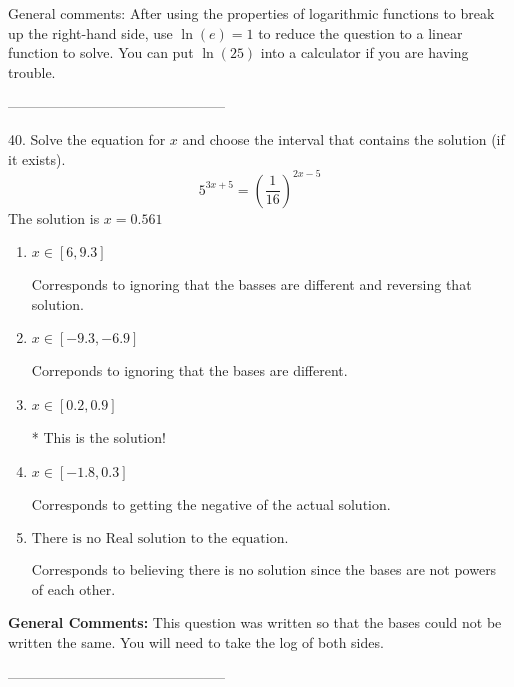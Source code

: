 \documentclass{article}[10pt]
\begin{document}
General comments: After using the properties of logarithmic functions to break up the right-hand side, use $\ln(e) = 1$ to reduce the question to a linear function to solve. You can put $\ln(25)$ into a calculator if you are having trouble.

-----------------------------------------------

40. Solve the equation for $x$ and choose the interval that contains the solution (if it exists).
$$ 5^{3x+5} = \left(\frac{1}{16}\right)^{2x-5} $$ 
The solution is $ x = 0.561 $ 

\begin{enumerate}[label=\Alph*.] 
\item $ x \in [6, 9.3] $ 

  Corresponds to ignoring that the basses are different and reversing that solution. 
\item $ x \in [-9.3, -6.9] $ 

  Correponds to ignoring that the bases are different. 
\item $ x \in [0.2, 0.9] $ 

 * This is the solution! 
\item $ x \in [-1.8, 0.3] $ 

  Corresponds to getting the negative of the actual solution. 
\item $ \text{There is no Real solution to the equation.} $ 

  Corresponds to believing there is no solution since the bases are not powers of each other. 
\end{enumerate} 
 
\textbf{General Comments:} This question was written so that the bases could not be written the same. You will need to take the log of both sides.

-----------------------------------------------
\end{document}
